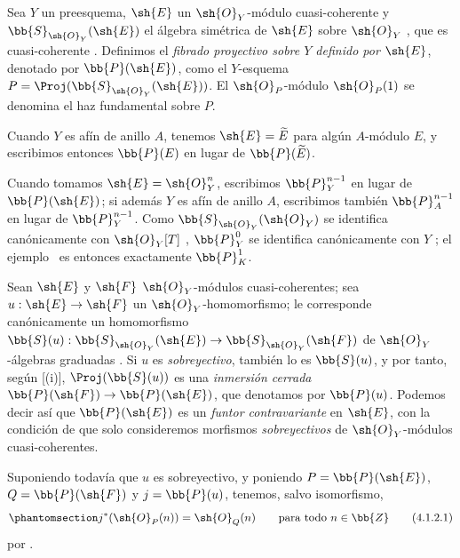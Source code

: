 \documentclass[oneside,10pt]{amsart}
\makeatletter
\newcommand{\ega@arrow}[2]{\mathchoice{#1}{#2}{#2}{#2}}
\renewcommand{\to}{\ega@arrow{\longrightarrow}{\rightarrow}}
\let\EGAOriginalLabel\label
\renewcommand{\label}[1]{\phantomsection\EGAOriginalLabel{#1}}
\makeatother
\begin{document}
\begin{definition}[4.1.1]
\label{II.4.1.1}
Sea $Y$ un preesquema, $\sh{E}$ un $\sh{O}_Y$-módulo cuasi-coherente y $\bb{S}_{\sh{O}_Y}(\sh{E})$ el álgebra simétrica de $\sh{E}$ sobre $\sh{O}_Y$ , que es cuasi-coherente .
Definimos el \emph{fibrado proyectivo sobre $Y$ definido por $\sh{E}$}, denotado por $\bb{P}(\sh{E})$, como el $Y$-esquema $P=\Proj(\bb{S}_{\sh{O}_Y}(\sh{E}))$.
El $\sh{O}_P$-módulo $\sh{O}_P(1)$ se denomina el haz fundamental sobre $P$.
\end{definition}

Cuando $Y$ es afín de anillo $A$, tenemos $\sh{E}=\widetilde{E}$ para algún $A$-módulo $E$, y escribimos entonces $\bb{P}(E)$ en lugar de $\bb{P}(\widetilde{E})$.

Cuando tomamos $\sh{E}=\sh{O}_Y^n$, escribimos $\bb{P}_Y^{n-1}$ en lugar de $\bb{P}(\sh{E})$;
si además $Y$ es afín de anillo $A$, escribimos también $\bb{P}_A^{n-1}$ en lugar de $\bb{P}_Y^{n-1}$.
Como $\bb{S}_{\sh{O}_Y}(\sh{O}_Y)$ se identifica canónicamente con $\sh{O}_Y[T]$ , $\bb{P}_Y^0$ se identifica canónicamente con $Y$ ;
el ejemplo~ es entonces exactamente $\bb{P}_K^1$.

\begin{env}[4.1.2]
\label{II.4.1.2}
Sean $\sh{E}$ y $\sh{F}$ $\sh{O}_Y$-módulos cuasi-coherentes;
sea $u:\sh{E}\to\sh{F}$ un $\sh{O}_Y$-homomorfismo;
le corresponde canónicamente un homomorfismo $\bb{S}(u):\bb{S}_{\sh{O}_Y}(\sh{E})\to\bb{S}_{\sh{O}_Y}(\sh{F})$ de $\sh{O}_Y$-álgebras graduadas .
Si $u$ es \emph{sobreyectivo}, también lo es $\bb{S}(u)$, y por tanto, según [(i)], $\Proj(\bb{S}(u))$ es una \emph{inmersión cerrada} $\bb{P}(\sh{F})\to\bb{P}(\sh{E})$, que denotamos por $\bb{P}(u)$.
Podemos decir así que $\bb{P}(\sh{E})$ es un \emph{funtor contravariante} en $\sh{E}$, con la condición de que solo consideremos morfismos \emph{sobreyectivos} de $\sh{O}_Y$-módulos cuasi-coherentes.

Suponiendo todavía que $u$ es sobreyectivo, y poniendo $P=\bb{P}(\sh{E})$, $Q=\bb{P}(\sh{F})$ y $j=\bb{P}(u)$, tenemos, salvo isomorfismo,
\[
\label{II.4.1.2.1}
  j^*(\sh{O}_P(n)) = \sh{O}_Q(n)
  \qquad\mbox{para todo $n\in\bb{Z}$}
  \tag{4.1.2.1}
\]
por .
\end{env}
\end{document}
